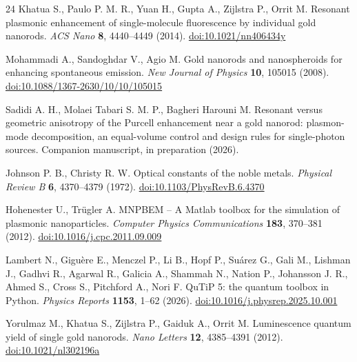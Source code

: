 \begin{thebibliography}{24}
 Khatua S., Paulo P. M. R., Yuan H., Gupta A., Zijlstra P., Orrit M. Resonant plasmonic enhancement of single-molecule fluorescence by individual gold nanorods. \textit{ACS Nano} \textbf{8}, 4440--4449 (2014). \href{https://doi.org/10.1021/nn406434y}{doi:10.1021/nn406434y}

 Mohammadi A., Sandoghdar V., Agio M. Gold nanorods and nanospheroids for enhancing spontaneous emission. \textit{New Journal of Physics} \textbf{10}, 105015 (2008). \href{https://doi.org/10.1088/1367-2630/10/10/105015}{doi:10.1088/1367-2630/10/10/105015}

 Sadidi A. H., Molaei Tabari S. M. P., Bagheri Harouni M. Resonant versus geometric anisotropy of the Purcell enhancement near a gold nanorod: plasmon-mode decomposition, an equal-volume control and design rules for single-photon sources. Companion manuscript, in preparation (2026).

 Johnson P. B., Christy R. W. Optical constants of the noble metals. \textit{Physical Review B} \textbf{6}, 4370--4379 (1972). \href{https://doi.org/10.1103/PhysRevB.6.4370}{doi:10.1103/PhysRevB.6.4370}

 Hohenester U., Trügler A. MNPBEM -- A Matlab toolbox for the simulation of plasmonic nanoparticles. \textit{Computer Physics Communications} \textbf{183}, 370--381 (2012). \href{https://doi.org/10.1016/j.cpc.2011.09.009}{doi:10.1016/j.cpc.2011.09.009}

 Lambert N., Giguère E., Menczel P., Li B., Hopf P., Suárez G., Gali M., Lishman J., Gadhvi R., Agarwal R., Galicia A., Shammah N., Nation P., Johansson J. R., Ahmed S., Cross S., Pitchford A., Nori F. QuTiP 5: the quantum toolbox in Python. \textit{Physics Reports} \textbf{1153}, 1--62 (2026). \href{https://doi.org/10.1016/j.physrep.2025.10.001}{doi:10.1016/j.physrep.2025.10.001}

 Yorulmaz M., Khatua S., Zijlstra P., Gaiduk A., Orrit M. Luminescence quantum yield of single gold nanorods. \textit{Nano Letters} \textbf{12}, 4385--4391 (2012). \href{https://doi.org/10.1021/nl302196a}{doi:10.1021/nl302196a}
\end{thebibliography}
